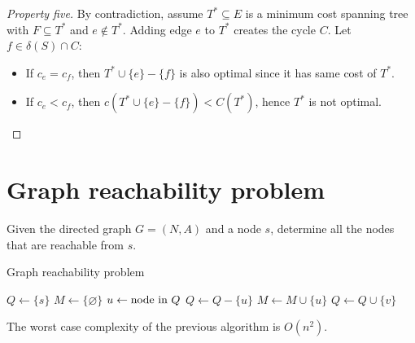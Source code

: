 \documentclass[12pt, a4paper]{report}
\newtheorem[style=M,bodystyle=\normalfont]{theorem}{Theorem}
\newtheorem[style=M,bodystyle=\normalfont]{corollary}{Corollary}
\newtheorem[style=M,bodystyle=\normalfont]{lemma}{Lemma}
\newtheorem[style=M,bodystyle=\normalfont]{definition}{Definition}
\begin{document}
    \begin{proof}[Property five]
        By contradiction, assume $T^{*} \subseteq E$ is a minimum cost spanning tree with $F \subseteq T^{*}$ and $e \notin T^{*}$. Adding edge $e$ to $T^{*}$ creates the cycle
        $C$. Let $f \in \delta(S) \cap C$: 
        \begin{itemize}
            \item If $c_e=c_f$, then $T^{*}\cup\{e\}-\{f\}$ is also optimal since it has same cost of $T^{*}$.
            \item If $c_e<c_f$, then $c\left(T^{*}\cup\{e\}-\{f\}\right)<C(T^{*})$, hence $T^{*}$ is not optimal.
        \end{itemize}
    \end{proof}

    \section{Graph reachability problem}
    Given the directed graph $G=(N,A)$ and a node $s$, determine all the nodes that are reachable from $s$. 
    \begin{algorithm}[H]
        \caption{Graph reachability problem}
            \begin{algorithmic}[1]
                \State $Q \leftarrow \{s\}$
                \State $M \leftarrow \{\varnothing\}$
                    \State $u \leftarrow \textnormal{node in } Q$
                    \State $Q \leftarrow Q-\{u\}$
                    \State $M \leftarrow M \cup \{u\}$
                            \State $Q \leftarrow Q \cup \{v\}$
                        \EndIf
                    \EndFor
                \EndWhile
            \end{algorithmic}
    \end{algorithm}
    The worst case complexity of the previous algorithm is $O(n^2)$.
\end{document}
